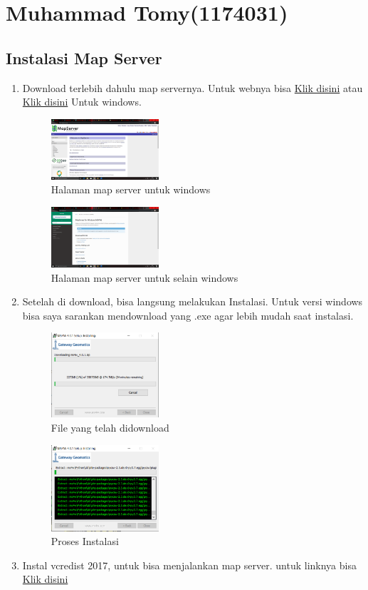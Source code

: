 \section{Muhammad Tomy(1174031)}
\subsection{Instalasi Map Server}
\begin{enumerate}
    \item Download terlebih dahulu map servernya. Untuk webnya bisa \href{https://mapserver.org/}{Klik disini} atau \href{https://ms4w.com/}{Klik disini} Untuk windows.
    \hfill\break
    \begin{figure}[H]
		\includegraphics[width=4cm]{figures/1174031/4/1.png}
		\centering
		\caption{Halaman map server untuk windows}
    \end{figure}
    \hfill\break
    \begin{figure}[H]
		\includegraphics[width=4cm]{figures/1174031/4/2.png}
		\centering
		\caption{Halaman map server untuk selain windows}
    \end{figure}
    \item Setelah di download, bisa langsung melakukan Instalasi. Untuk versi windows bisa saya sarankan mendownload yang .exe agar lebih mudah saat instalasi.
    \hfill\break
    \begin{figure}[H]
		\includegraphics[width=4cm]{figures/1174031/4/3.png}
		\centering
		\caption{File yang telah didownload}
    \end{figure}
    \hfill\break
    \begin{figure}[H]
		\includegraphics[width=4cm]{figures/1174031/4/4.png}
		\centering
		\caption{Proses Instalasi}
    \end{figure}
    \item Instal vcredist 2017, untuk bisa menjalankan map server. untuk linknya bisa \href{https://support.microsoft.com/id-id/help/2977003/the-latest-supported-visual-c-downloads}{Klik disini}
\end{enumerate}
